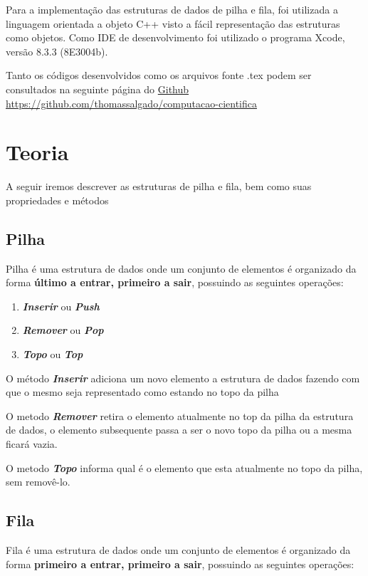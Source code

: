 \documentclass[rascunho,xindy,sublist]{fei}
\begin{document}
Para a implementação das estruturas de dados de pilha e fila, foi utilizada a linguagem orientada a objeto C++ visto a fácil representação das estruturas como objetos.
Como IDE de desenvolvimento foi utilizado o programa Xcode, versão 8.3.3 (8E3004b).

Tanto os códigos desenvolvidos como os arquivos fonte .tex podem ser consultados na seguinte página do  \href{https://github.com/thomassalgado/computacao-cientifica}{Github} 
\url{https://github.com/thomassalgado/computacao-cientifica}

\chapter{Teoria}

A seguir iremos descrever as estruturas de pilha e fila, bem como suas propriedades e métodos

\section{Pilha}

Pilha é uma estrutura de dados onde um conjunto de elementos é organizado da forma \textbf{último a entrar, primeiro a sair}, possuindo as seguintes operações:

\begin{enumerate}
  \item \textbf{\textit{Inserir}} ou \textbf{\textit{Push}}
  \item \textbf{\textit{Remover}} ou \textbf{\textit{Pop}}
  \item \textbf{\textit{Topo}} ou \textbf{\textit{Top}}
\end{enumerate}

O método \textbf{\textit{Inserir}} adiciona um novo elemento a estrutura de dados fazendo com que o mesmo seja representado como estando no topo da pilha

O metodo \textbf{\textit{Remover}} retira o elemento atualmente no top da pilha da estrutura de dados, o elemento subsequente passa a ser o novo topo da pilha ou a mesma ficará vazia.

O metodo \textbf{\textit{Topo}} informa qual é o elemento que esta atualmente no topo da pilha, sem removê-lo.

\section{Fila}

Fila é uma estrutura de dados onde um conjunto de elementos é organizado da forma \textbf{primeiro a entrar, primeiro a sair}, possuindo as seguintes operações:
\end{document}
